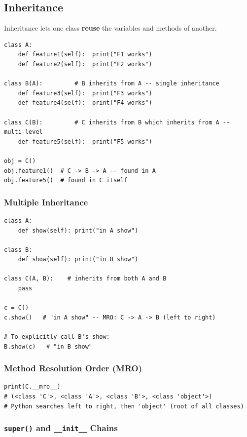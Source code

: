 \documentclass[12pt,a4paper]{article}
\begin{document}
\subsection{Inheritance}

Inheritance lets one class \textbf{reuse} the variables and methods of another.

\begin{lstlisting}
class A:
    def feature1(self):  print("F1 works")
    def feature2(self):  print("F2 works")

class B(A):         # B inherits from A -- single inheritance
    def feature3(self):  print("F3 works")
    def feature4(self):  print("F4 works")

class C(B):         # C inherits from B which inherits from A -- multi-level
    def feature5(self):  print("F5 works")

obj = C()
obj.feature1()  # C -> B -> A -- found in A
obj.feature5()  # found in C itself
\end{lstlisting}

\subsubsection{Multiple Inheritance}

\begin{lstlisting}
class A:
    def show(self): print("in A show")

class B:
    def show(self): print("in B show")

class C(A, B):    # inherits from both A and B
    pass

c = C()
c.show()   # "in A show" -- MRO: C -> A -> B (left to right)

# To explicitly call B's show:
B.show(c)   # "in B show"
\end{lstlisting}

\subsubsection{Method Resolution Order (MRO)}

\begin{lstlisting}
print(C.__mro__)
# (<class 'C'>, <class 'A'>, <class 'B'>, <class 'object'>)
# Python searches left to right, then 'object' (root of all classes)
\end{lstlisting}

\subsubsection{\texttt{super()} and \texttt{\_\_init\_\_} Chains}
\end{document}
